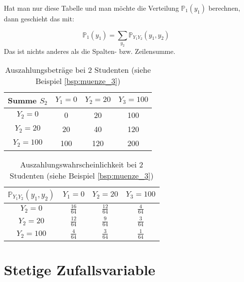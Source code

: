 {\begin{bsp}
    Hat man nur diese Tabelle und man
    möchte die Verteilung $\mathbb P_{1}\left(y_{1}\right)$ berechnen, dann geschieht das mit:

    \[
    \mathbb P_{1}\left(y_{1}\right)=\sum_{y_2}{\mathbb P_{Y_{1}Y_{2}}(y_{1},y_{2})}
    \]
    Das ist nichts anderes als die Spalten- bzw. Zeilensumme. 

    \end{bsp}

    \begin{table}
        \centering
        \begin{tabular}{c|ccc}
        \hline
        \textbf{Summe $S_2$} & $Y_1=0$ & $Y_2=20$ & $Y_3=100$\\
        \hline
         $Y_2=0$ & 0 & 20 & 100\\
         \hline
         $Y_2=20$ & 20 & 40 & 120\\
         \hline
         $Y_2=100$ & 100 & 120 & 200\\
         \hline
        \end{tabular}
        \caption{Auszahlungsbeträge bei 2 Studenten (siehe Beispiel \ref{bsp:muenze_3})}\label{tab:auszahlung_2_studenten}
    \end{table}

    \begin{table}
        \centering
        \begin{tabular}{c|ccc}
        \hline
        \textbf{$\mathbb P_{Y_1Y_2}(y_1,y_2)$} & $Y_1=0$ & $Y_2=20$ & $Y_3=100$\\
        \hline
         $Y_2=0$ & $\frac{16}{64}$ & $\frac{12}{64}$ & $\frac{4}{64}$\\
         \hline
         $Y_2=20$ & $\frac{12}{64}$ & $\frac{9}{64}$ & $\frac{3}{64}$\\
         \hline
         $Y_2=100$ & $\frac{4}{64}$ & $\frac{3}{64}$ & $\frac{1}{64}$\\
         \hline
        \end{tabular}
        \caption{Auszahlungswahrscheinlichkeit bei 2 Studenten (siehe Beispiel \ref{bsp:muenze_3})}\label{tab:auszahlungswahrscheinlichkeit_2_studenten}
    \end{table}

    \section{Stetige Zufallsvariable}

}
